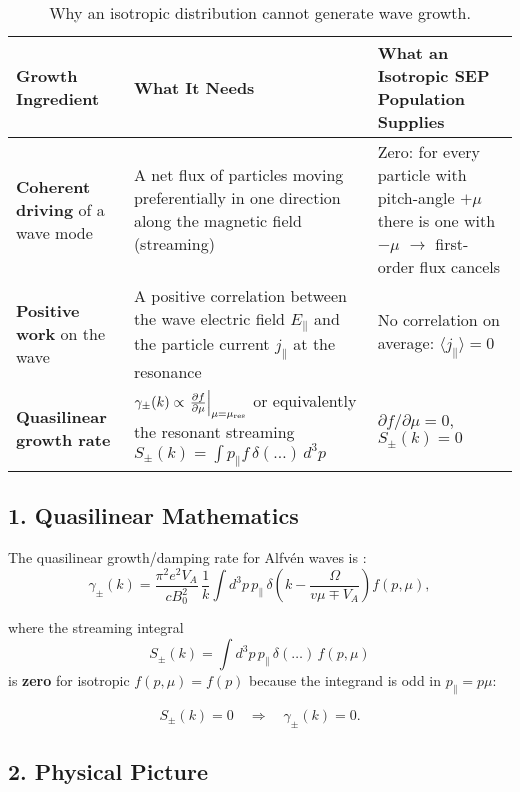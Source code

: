 \begin{table}[H]
\centering
\renewcommand{\arraystretch}{1.4}
\begin{tabular}{|p{3.2cm}|p{5.5cm}|p{5.5cm}|}
\hline
\textbf{Growth Ingredient} & \textbf{What It Needs} & \textbf{What an Isotropic SEP Population Supplies} \\
\hline
\textbf{Coherent driving} of a wave mode & A net flux of particles moving preferentially in one direction along the magnetic field (streaming) & Zero: for every particle with pitch-angle $+\mu$ there is one with $-\mu$ $\rightarrow$ first-order flux cancels \\
\hline
\textbf{Positive work} on the wave & A positive correlation between the wave electric field $E_\parallel$ and the particle current $j_\parallel$ at the resonance & No correlation on average: $\langle j_\parallel \rangle = 0$ \\
\hline
\textbf{Quasilinear growth rate} & $\gamma_\pm(k) \propto \left.\frac{\partial f}{\partial \mu}\right|_{\mu = \mu_{\rm res}}$ or equivalently the resonant streaming $S_\pm(k) = \int p_\parallel f\,\delta(\dots)\,d^3p$ & $\partial f/\partial\mu = 0$, $S_\pm(k) = 0$ \\
\hline
\end{tabular}
\caption{Why an isotropic distribution cannot generate wave growth.}
\end{table}

\subsection*{1. Quasilinear Mathematics}

The quasilinear growth/damping rate for Alfvén waves is \cite{Jokipii1966, Skilling1975}:
\begin{equation}
\gamma_\pm(k) =
\frac{\pi^2 e^2 V_A}{c B_0^2}\,
\frac{1}{k} \int d^3p\, p_\parallel\,
\delta\left(k - \frac{\Omega}{v\mu \mp V_A}\right)
f(p, \mu),
\end{equation}

where the streaming integral
\[
S_\pm(k) = \int d^3p\, p_\parallel\, \delta(\dots)\, f(p,\mu)
\]
is \textbf{zero} for isotropic $f(p,\mu) = f(p)$ because the integrand is odd in $p_\parallel = p\mu$:

\[
S_\pm(k) = 0 \quad \Longrightarrow \quad \boxed{\gamma_\pm(k) = 0}.
\]

\subsection*{2. Physical Picture}

